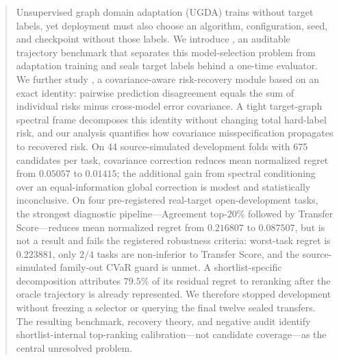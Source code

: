 \begin{abstract}
Unsupervised graph domain adaptation (UGDA) trains without target labels, yet
deployment must also choose an algorithm, configuration, seed, and checkpoint
without those labels. We introduce \benchmark, an auditable trajectory
benchmark that separates this model-selection problem from adaptation
training and seals target labels behind a one-time evaluator. We further study
\method, a covariance-aware risk-recovery module based on an exact identity:
pairwise prediction disagreement equals the sum of individual risks minus
cross-model error covariance. A tight target-graph spectral frame decomposes
this identity without changing total hard-label risk, and our analysis
quantifies how covariance misspecification propagates to recovered risk.
On 44 source-simulated development folds with 675 candidates per task,
covariance correction reduces mean normalized regret from $0.05057$ to
$0.01415$; the additional gain from spectral conditioning over an
equal-information global correction is modest and statistically
inconclusive. On four pre-registered real-target open-development tasks, the
strongest diagnostic pipeline---Agreement top-$20\%$ followed by Transfer
Score---reduces mean normalized regret from $0.216807$ to $0.087507$, but is
not a \method result and fails the registered robustness criteria: worst-task
regret is $0.223881$, only $2/4$ tasks are non-inferior to Transfer Score, and
the source-simulated family-out CVaR guard is unmet. A shortlist-specific
decomposition attributes $79.5\%$ of its residual regret to reranking after
the oracle trajectory is already represented. We therefore stopped
development without freezing a selector or querying the final twelve sealed
transfers. The resulting benchmark, recovery theory, and negative audit
identify shortlist-internal top-ranking calibration---not candidate
coverage---as the central unresolved problem.
\end{abstract}
